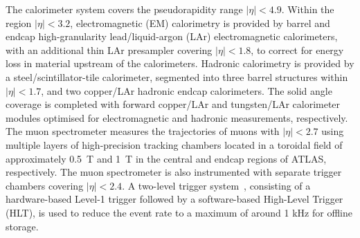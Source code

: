 The calorimeter system covers the pseudorapidity range $|\eta| < 4.9$.
Within the region $|\eta|< 3.2$, electromagnetic (EM) calorimetry is provided by barrel and 
endcap high-granularity lead/liquid-argon (LAr) electromagnetic calorimeters,
with an additional thin LAr presampler covering $|\eta| < 1.8$,
to correct for energy loss in material upstream of the calorimeters.
Hadronic calorimetry is provided by %
a
steel/scintillator-tile calorimeter,
segmented into three barrel structures within $|\eta| < 1.7$, and two copper/LAr hadronic endcap calorimeters.
The solid angle coverage is completed with forward copper/LAr and tungsten/LAr calorimeter modules
optimised for electromagnetic and hadronic measurements, respectively.
The muon spectrometer measures the %
trajectories
of muons with $|\eta|<2.7$ using multiple layers of high-precision tracking 
chambers located in a toroidal field of approximately 0.5~T and 1~T in the central and endcap regions of ATLAS, respectively. 
The muon spectrometer is also instrumented with separate trigger chambers covering $|\eta|<2.4$.
A two-level trigger system~\cite{Aaboud:2016leb}, consisting of a hardware-based Level-1 trigger followed by 
a software-based High-Level Trigger (HLT), is used to reduce the event rate to a maximum of around 1 kHz for offline storage.
